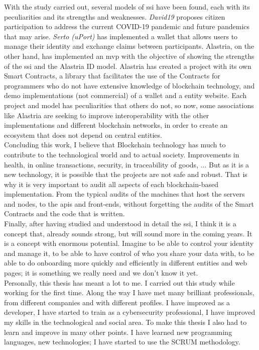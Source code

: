 \documentclass[a4paper, 12pt]{article} %
\begin{document}
    With the study carried out, several models of \acrshort{ssi} have been found, each with its peculiarities and its strengths and weaknesses. \textit{David19} proposes citizen participation to address the current COVID-19 pandemic and future pandemics that may arise. \textit{Serto (uPort)} has implemented a wallet that allows users to manage their identity and exchange claims between participants. Alastria, on the other hand, has implemented an \acrlong{mvp} with the objective of showing the strengths of the \acrshort{ssi} and the Alastria ID model. Alastria has created a project with its own Smart Contracts, a library that facilitates the use of the Contracts for programmers who do not have extensive knowledge of blockchain technology, and demo implementations (not commercial) of a wallet and a entity website. Each project and model has peculiarities that others do not, so now, some associations like Alastria are seeking to improve interoperability with the other implementations and different blockchain networks, in order to create an ecosystem that does not depend on central entities.\\
    
    Concluding this work, I believe that Blockchain technology has much to contribute to the technological world and to actual society. Improvements in health, in online transactions, security, in traceability of goods, ... But as it is a new technology, it is possible that the projects are not safe and robust. That is why it is very important to audit all aspects of each blockchain-based implementation. From the typical audits of the machines that host the servers and nodes, to the \acrshort{api}s and front-ends, without forgetting the audits of the Smart Contracts and the code that is written.\\
    
    Finally, after having studied and understood in detail the \acrlong{ssi}, I think it is a concept that, already sounds strong, but will sound more in the coming years. It is a concept with enormous potential. Imagine to be able to control your identity and manage it, to be able to have control of who you share your data with, to be able to do onboarding more quickly and efficiently in different entities and web pages; it is something we really need and we don't know it yet.\\
    
    Personally, this thesis has meant a lot to me. I carried out this study while working for the first time. Along the way I have met many brilliant professionals, from different companies and with different profiles. I have improved as a developer, I have started to train as a cybersecurity professional, I have improved my skills in the technological and social area. To make this thesis I also had to learn and improve in many other points. I have learned new programming languages, new technologies; I have started to use the SCRUM methodology.\\
    
\end{document}
